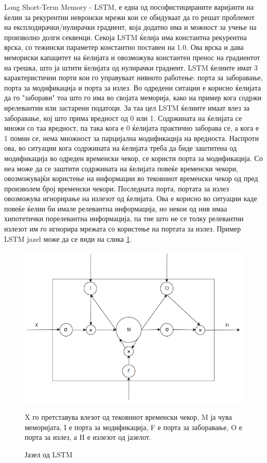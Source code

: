 Long Short-Term Memory - LSTM, е една од пософистицираните варијанти на ќелии за рекурентни невронски мрежи кои се обидуваат да го решат проблемот на експлодирачки/нулирачки градиент, која додатно има и можност за учење на произволно долги секвенци. Секоја LSTM ќелија има константна рекурентна врска, со тежински параметер константно поставен на 1.0. Ова врска и дава мемориски капацитет на ќелијата и овозможува константен пренос на градиентот на грешка, што ја штити ќелијата од нулирачки градиент. 
LSTM ќелиите имат 3 карактеристични порти кои го управуваат нивното работење: порта за заборавање, порта за модификација и порта за излез. Во одредени ситации е корисно ќелијата да го "заборави" тоа што го има во својата меморија, како на пример кога содржи ирелевантни или застарени податоци. За таа цел LSTM ќелиите имаат влез за заборавање, кој што прима вредност од 0 или 1. Содржината на ќелијата се множи со таа вредност, па така кога е 0 ќелијата практично заборава се, а кога е 1 помни се, нема множност за парцијална модификација на вредноста. Наспроти ова, во ситуации кога содржината на ќелијата треба да биде заштитена од модификација во одреден временски чекор, се користи порта за модификација. Со неа може да се заштити содржината на ќелијата повеќе временски чекори, овозможувајќи користење на информации во тековниот временски чекор од пред произволем број временски чекори. Последната порта, портата за излез овозможува игнорирање на излезот од ќелијата. Ова е корисно во ситуации каде повеќе ќелии би имале релевантна информација, но некои од нив имаа хипотетички порелевантна информација, па тие што не се толку релевантни излезот им го игнорира мрежата со користење на портата за излез. Пример LSTM jazel може да се види на слика \ref{fig:lstm}.

\begin{figure}[H]
	\centering
    \includegraphics[scale=0.6]{images/lstm.png}
	\caption{Јазел од LSTM}
	X го претставува влезот од тековниот временски чекор, M ја чува меморијата, I е порта за модификација, F е порта за заборавање, O е порта за излез, а H е излезот од јазелот.
	\label{fig:lstm}
\end{figure}

